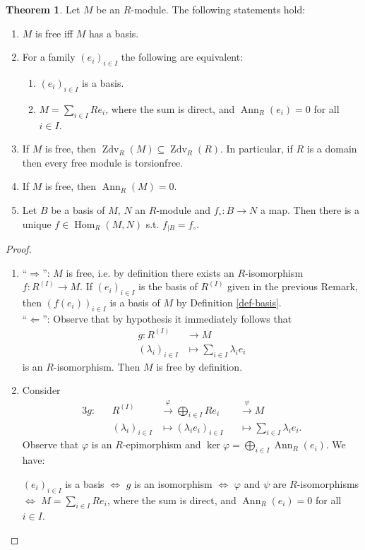 \documentclass[12pt,a4paper]{report}
\theoremstyle{definition}
\newtheorem{theorem}{Theorem}[chapter] %
\theoremstyle{num.custom-title}
\DeclareMathOperator{\Zdv}{Zdv}
\DeclareMathOperator{\Hom}{Hom}
\DeclareMathOperator{\Ann}{Ann}
\DeclareMathOperator{\imp}{\Rightarrow}
\DeclareMathOperator{\pmi}{\Leftarrow}
\DeclareMathOperator{\sse}{\subseteq}
\renewcommand{\phi}{\varphi}
\renewcommand{\iff}{\Leftrightarrow}
\begin{document}
\begin{theorem}\label{thm-free-mod-prop}
Let $M$ be an $R$-module. The following statements hold:
\begin{enumerate}
\item $M$ is free iff $M$ has a basis.
\item For a family $(e_i)_{i \in I}$ the following are equivalent:
\begin{enumerate}
\item $(e_i)_{i \in I}$ is a basis.
\item $M = \sum_{i \in I} Re_i$, where the sum is direct, and $\Ann_R(e_i)=0$ for all $i \in I$.
\end{enumerate}
\item If $M$ is free, then $\Zdv_R(M) \sse \Zdv_R(R)$. In particular, if $R$ is a domain then every free module is torsionfree.
\item If $M$ is free, then $\Ann_R(M)=0$.
\item Let $B$ be a basis of $M$, $N$ an $R$-module and $f_\circ : B \to N$ a map. Then there is a unique $f \in \Hom_R(M,N)$ s.t. $f_{|B} = f_\circ$.
\end{enumerate}
\begin{proof}\ 
\begin{enumerate}
\item ``$\imp$'': $M$ is free, i.e. by definition there exists an $R$-isomorphism $f: R^{(I)} \to M$. If $(e_i)_{i \in I}$ is the basis of $R^{(I)}$ given in the previous Remark, then $(f(e_i))_{i \in I}$ is a basis of $M$ by Definition \ref{def-basis}.\\
``$\pmi$'': Observe that by hypothesis it immediately follows that
\begin{align*}
g: R^{(I)} &\to M \\
(\lambda_i)_{i \in I} &\mapsto \sum_{i \in I} \lambda_i e_i
\end{align*}
is an $R$-isomorphism. Then $M$ is free by definition.
\item Consider
\begin{alignat*}{3}
g \colon && R^{(I)} &\stackrel{\phi}{\to} \bigoplus_{i \in I} Re_i &&\stackrel{\psi}{\to} M \\
&& (\lambda_i)_{i \in I} &\mapsto (\lambda_i e_i)_{i \in I} &&\mapsto \sum_{i \in I} \lambda_i e_i .
\end{alignat*}
Observe that $\phi$ is an $R$-epimorphism and $\ker \phi = \bigoplus_{i \in I} \Ann_R(e_i)$. We have:
\begin{center}
$(e_i)_{i \in I}$ is a basis $\iff$ $g$ is an isomorphism $\iff$ $\phi$ and $\psi$ are $R$-isomorphisms $\iff$ $M=\sum_{i \in I} Re_i$, where the sum is direct, and $\Ann_R(e_i)=0$ for all $i \in I$.

\end{center}
\end{enumerate}
\end{proof}
\end{theorem}
\end{document}
